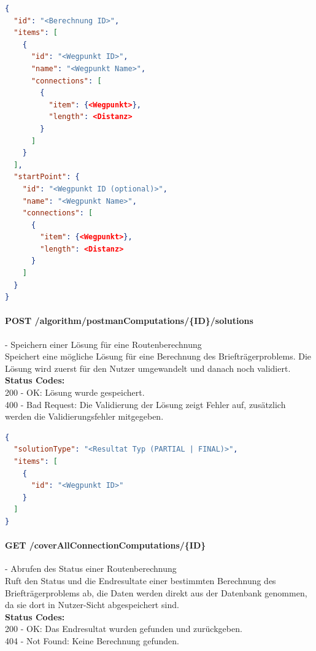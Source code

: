 \begin{lstlisting}[language=JSON, caption=Beispiel für Eingabedaten des Briefträgerproblems für den Algorithmus, label=lst:input_postman_algo]  
{
  "id": "<Berechnung ID>",
  "items": [
    {
      "id": "<Wegpunkt ID>",
      "name": "<Wegpunkt Name>",
      "connections": [
        {
          "item": {<Wegpunkt>},
          "length": <Distanz>
        }
      ]
    }
  ],
  "startPoint": {
    "id": "<Wegpunkt ID (optional)>",
    "name": "<Wegpunkt Name>",
    "connections": [
      {
        "item": {<Wegpunkt>},
        "length": <Distanz>
      }
    ]
  }
}
\end{lstlisting}

\paragraph{POST /algorithm/postmanComputations/\{ID\}/solutions} - Speichern einer Lösung für eine Routenberechnung\mbox{}\\
Speichert eine mögliche Lösung für eine Berechnung des Briefträgerproblems. Die Lösung wird zuerst für den Nutzer umgewandelt und danach noch validiert.\\
\textbf{Status Codes:}\\
200 - OK: Lösung wurde gespeichert.\\
400 - Bad Request: Die Validierung der Lösung zeigt Fehler auf, zusätzlich werden die Validierungsfehler mitgegeben.\\

\begin{lstlisting}[language=JSON, caption=Beispiel eines Resultates für das Briefträgerproblem aus Algorithmus-Sicht, label=lst:solution_postman_algo]  
{
  "solutionType": "<Resultat Typ (PARTIAL | FINAL)>",
  "items": [
    {
      "id": "<Wegpunkt ID>"
    }
  ]
}
\end{lstlisting}

\paragraph{GET /coverAllConnectionComputations/\{ID\}} - Abrufen des Status einer Routenberechnung\mbox{}\\
Ruft den Status und die Endresultate einer bestimmten Berechnung des Briefträgerproblems ab, die Daten werden direkt aus der Datenbank genommen, da sie dort in Nutzer-Sicht abgespeichert sind.\\
\textbf{Status Codes:}\\
200 - OK: Das Endresultat wurden gefunden und zurückgeben.\\
404 - Not Found: Keine Berechnung gefunden.\\

